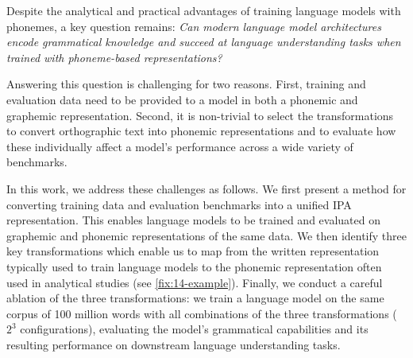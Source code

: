 \vspace{.3cm}

Despite the analytical and practical advantages of training language models with phonemes, a key question remains: \emph{Can modern language model architectures encode grammatical knowledge and succeed at language understanding tasks when trained with phoneme-based representations?} 

Answering this question is challenging for two reasons. First, training and evaluation data need to be provided to a model in both a phonemic and graphemic representation. Second, it is non-trivial to select the transformations to convert orthographic text into phonemic representations and to evaluate how these individually affect a model's performance across a wide variety of benchmarks.



In this work, we address these challenges as follows. We first present a method for converting training data and evaluation benchmarks into a unified IPA representation. This enables language models to be trained and evaluated on graphemic and phonemic representations of the same data. We then identify three key transformations which enable us to map from the written representation typically used to train language models to the phonemic representation often used in analytical studies (see \cref{fix:14-example}). Finally, we conduct a careful ablation of the three transformations: we train a language model on the same corpus of 100 million words with all combinations of the three transformations ($2^3$ configurations), evaluating the model's grammatical capabilities and its resulting performance on downstream language understanding tasks. 


